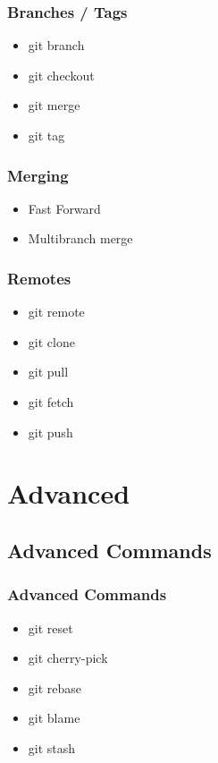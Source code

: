 \documentclass{beamer}
\begin{document}
			\begin{frame}
				\frametitle{Branches / Tags}

				\begin{itemize}
					\item{git branch}
					\item{git checkout}
					\item{git merge}
					\item{git tag}
				\end{itemize}
			\end{frame}

			\begin{frame}
				\frametitle{Merging}

				\begin{itemize}
					\item{Fast Forward}
					\item{Multibranch merge}
				\end{itemize}
			\end{frame}

			\begin{frame}
				\frametitle{Remotes}

				\begin{itemize}
					\item{git remote}
					\item{git clone}
					\item{git pull}
					\item{git fetch}
					\item{git push}
				\end{itemize}
			\end{frame}

	\section{Advanced}

		\subsection{Advanced Commands}

			\begin{frame}
				\frametitle{Advanced Commands}

				\begin{itemize}
					\item{git reset}
					\item{git cherry-pick}
					\item{git rebase}
					\item{git blame}
					\item{git stash}
				\end{itemize}
			\end{frame}
\end{document}
